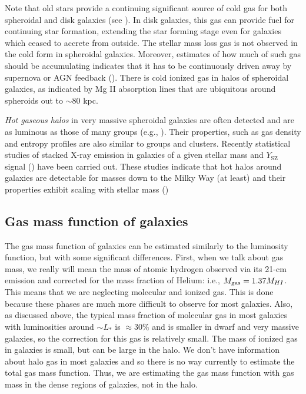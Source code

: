 Note that old stars provide a continuing significant source of cold gas for both spheroidal and disk galaxies (see \href{}{\citealt{leitner_kravtsov11}}). In disk galaxies, this gas can provide fuel for continuing star formation, extending the star forming stage even for galaxies which ceased to accrete from outside. The stellar mass loss gas is not observed in the cold form in spheroidal galaxies. Moreover, estimates of how much of such gas should be accumulating indicates that it has to be continuously driven away by supernova or AGN feedback (\href{http://adsabs.harvard.edu/abs/2015ApJ...803...77C}{\citealt{conroy_etal15}}). There is cold ionized gas in halos of spheroidal galaxies, as indicated by Mg II absorption lines that are ubiquitous around spheroids out to $\sim 80$ kpc. 

{\it Hot gaseous halos} in very massive spheroidal galaxies are often detected and are as luminous as those of many groups (e.g., \href{http://adsabs.harvard.edu/abs/2016arXiv160401764G}{\citealt{goulding_etal16}}). Their properties, such as gas density and entropy profiles are also similar to groups and clusters. 
Recently statistical studies of stacked X-ray emission in galaxies of a given stellar mass and $Y_{\mathrm{SZ}}$ signal (\href{http://adsabs.harvard.edu/abs/2013A%26A...557A..52P}{\citealt{ade_etal13}}) have been carried out. These studies indicate that hot halos around galaxies are detectable for masses down to the Milky Way (at least) and their properties exhibit scaling with stellar mass (\href{http://adsabs.harvard.edu/abs/2015MNRAS.449.3806A}{\citealt{anderson_etal15}})

\subsection{Gas mass function of galaxies}

The gas mass function of galaxies can be estimated similarly to the luminosity function, but with some significant differences. First, when we talk about gas mass, we really will mean the mass of atomic hydrogen observed via its 21-cm emission and corrected for the mass fraction of Helium: i.e., $M_{\rm gas}=1.37M_{HI}$. This means that we are neglecting molecular and ionized gas. This is done because these phases are much more difficult to observe for most galaxies. Also, as discussed above, the typical mass fraction of molecular gas in most  galaxies with luminosities around $\sim L_*$ is $\approx 30\%$ and is smaller in dwarf and very massive galaxies, so the correction for this gas is relatively small. The mass of ionized gas in galaxies is small, but can be large in the halo. We don't have information about halo gas in most galaxies and so there is no way currently to estimate the total gas mass function. Thus, we are estimating the gas mass function with gas mass in the dense regions of galaxies, not in the halo.


